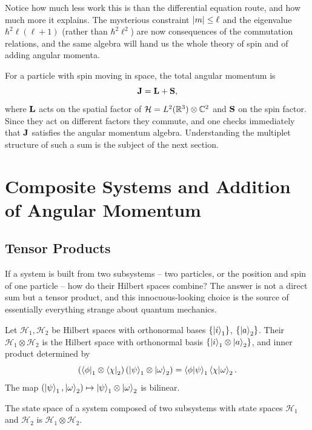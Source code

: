 \documentclass[a4paper]{scrartcl}
\begin{document}
\begin{remark}
    Notice how much less work this is than the differential equation route, and how much more it explains. The mysterious constraint $\lvert m\rvert\leq\ell$ and the eigenvalue $\hbar^2\ell(\ell+1)$ (rather than $\hbar^2\ell^2$) are now consequences of the commutation relations, and the same algebra will hand us the whole theory of spin and of adding angular momenta.
\end{remark}

For a particle with spin moving in space, the total angular momentum is
$$
\mathbf{J} = \mathbf{L} + \mathbf{S},
$$
where $\mathbf{L}$ acts on the spatial factor of $\mathcal{H} = L^2(\mathbb{R}^3)\otimes\mathbb{C}^2$ and $\mathbf{S}$ on the spin factor. Since they act on different factors they commute, and one checks immediately that $\mathbf{J}$ satisfies the angular momentum algebra. Understanding the multiplet structure of such a sum is the subject of the next section.

\section{Composite Systems and Addition of Angular Momentum}

\subsection{Tensor Products}\label{sec:tensor}

If a system is built from two subsystems -- two particles, or the position and spin of one particle -- how do their Hilbert spaces combine? The answer is not a direct sum but a tensor product, and this innocuous-looking choice is the source of essentially everything strange about quantum mechanics.

\begin{definition}
    Let $\mathcal{H}_1, \mathcal{H}_2$ be Hilbert spaces with orthonormal bases $\{\ket{i}_1\}$, $\{\ket{a}_2\}$. Their  $\mathcal{H}_1 \otimes \mathcal{H}_2$ is the Hilbert space with orthonormal basis $\{\ket{i}_1 \otimes \ket{a}_2\}$, and inner product determined by
    $$
    \left( \bra{\phi}_1\otimes\bra{\chi}_2 \right)\left( \ket{\psi}_1\otimes\ket{\omega}_2 \right) = \braket{\phi}{\psi}_1 \braket{\chi}{\omega}_2.
    $$
    The map $(\ket\psi_1, \ket\omega_2) \mapsto \ket\psi_1\otimes\ket\omega_2$ is bilinear.
\end{definition}

\begin{axiom}
    The state space of a system composed of two subsystems with state spaces $\mathcal{H}_1$ and $\mathcal{H}_2$ is $\mathcal{H}_1 \otimes \mathcal{H}_2$.
\end{axiom}
\end{document}
